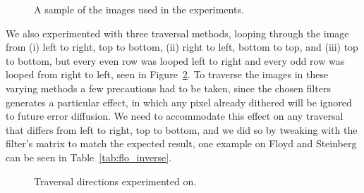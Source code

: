 \documentclass[conference]{IEEEtran}
\begin{document}
\begin{figure}[H]
{{		}
		\label{fig:bee}
	}
	\quad
	\quad
	\caption{A sample of the images used in the experiments.}
	\label{fig:input}
\end{figure}

We also experimented with three traversal methods, looping through the image from (i) left to right, top to bottom, (ii) right to left, bottom to top, and (iii) top to bottom, but every even row was looped left to right and every odd row was looped from right to left, seen in Figure~\ref{fig:traversal}. To traverse the images in these varying methods a few precautions had to be taken, since the chosen filters generates a particular effect, in which any pixel already dithered will be ignored to future error diffusion. We need to accommodate this effect on any traversal that differs from left to right, top to bottom, and we did so by tweaking with the filter's matrix to match the expected result, one example on Floyd and Steinberg can be seen in Table~\ref{tab:flo_inverse}.

\begin{figure}[H]
	\centering
	\quad
	\quad
	\caption{Traversal directions experimented on.}
	\label{fig:traversal}
\end{figure}
\end{document}

